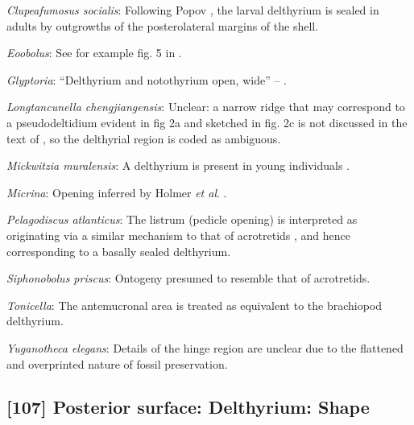 \documentclass[openany]{book}
\theoremstyle{definition}
\theoremstyle{definition}
\theoremstyle{definition}
\theoremstyle{remark}
\begin{document}
\hypertarget{Clupeafumosus_socialis-coding-106}{}
\emph{Clupeafumosus socialis}: Following Popov
\citeyearpar{Popov1992TheCambrian}, the larval delthyrium is sealed in
adults by outgrowths of the posterolateral margins of the shell.

\hypertarget{Eoobolus-coding-106}{}
\emph{Eoobolus}: See for example fig. 5 in
\citet{Balthasar2009Thebrachiopod}.

\hypertarget{Glyptoria-coding-106}{}
\emph{Glyptoria}: ``Delthyrium and notothyrium open, wide'' --
\citet{Cooper1976LowerCambrian}.

\hypertarget{Longtancunella_chengjiangensis-coding-106}{}
\emph{Longtancunella chengjiangensis}: Unclear: a narrow ridge that may
correspond to a pseudodeltidium evident in fig 2a and sketched in fig.
2c is not discussed in the text of \citet{Zhang2011Theexceptionally}, so
the delthyrial region is coded as ambiguous.

\hypertarget{Mickwitzia_muralensis-coding-106}{}
\emph{Mickwitzia muralensis}: A delthyrium is present in young
individuals \citep{Balthasar2004Shellstructure}.

\hypertarget{Micrina-coding-106}{}
\emph{Micrina}: Opening inferred by Holmer \emph{et al}.
\citeyearpar{Holmer2008TheEarly}.

\hypertarget{Pelagodiscus_atlanticus-coding-106}{}
\emph{Pelagodiscus atlanticus}: The listrum (pedicle opening) is
interpreted as originating via a similar mechanism to that of
acrotretids \citep{Popov1992TheCambrian}, and hence corresponding to a
basally sealed delthyrium.

\hypertarget{Siphonobolus_priscus-coding-106}{}
\emph{Siphonobolus priscus}: Ontogeny presumed to resemble that of
acrotretids.

\hypertarget{Tonicella-coding-106}{}
\emph{Tonicella}: The antemucronal area \citep{Schwabe2010} is treated
as equivalent to the brachiopod delthyrium.

\hypertarget{Yuganotheca_elegans-coding-106}{}
\emph{Yuganotheca elegans}: Details of the hinge region are unclear due
to the flattened and overprinted nature of fossil preservation.

\subsection*{{[}107{]} Posterior surface: Delthyrium:
Shape}\label{posterior-surface-delthyrium-shape}
\end{document}
